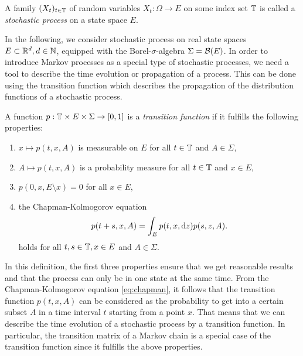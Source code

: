 \begin{defi}
A family $(X_t)_{t\in\mathbb{T}}$ of random variables $X_t : \Omega \rightarrow E$ on some index set $\mathbb{T}$ is called
a \textit{stochastic process} on a state space $E$.
\end{defi}

In the following, we consider stochastic process on real state spaces $E \subset \mathbb{R}^d, d \in \mathbb{N}$, equipped with the Borel-$\sigma$-algebra $\Sigma = \mathcal{B}(E)$. 
In order to introduce Markov processes as a special type of stochastic processes, we need a
tool to describe the time evolution or propagation of a process. This can be done using the transition function which describes the propagation of the distribution functions of a stochastic process.

\begin{defi}
A function $p: \mathbb{T} \times E \times \Sigma \rightarrow [0,1]$ is a \textit{transition function} if it fulfills the following properties:
\begin{enumerate}
\item $x \mapsto p(t,x,A)$ is measurable on $E$ for all $t\in\mathbb{T}$ and $A\in\Sigma$,
\item $A \mapsto p(t,x,A)$ is a probability measure for all $t\in\mathbb{T}$ and $x\in E$,
\item $p(0,x,E \setminus x) = 0$ for all $x \in E$,
\item the Chapman-Kolmogorov equation
\begin{equation}
\label{eq:chapman}
p(t+s,x,A) = \int_E p(t,x,\mathop{}\!\mathrm{d} z)p(s,z,A).
\end{equation}
holds for all $t,s\in\mathbb{T}, x\in E$ and $A\in\Sigma$.
\end{enumerate}
\end{defi}
In this definition, the first three properties ensure that we get reasonable results and that the process can only be in one state at the same time.
From the Chapman-Kolmogorov equation \eqref{eq:chapman}, it follows that the transition function $p(t,x,A)$ can be considered as the probability  to get into a certain subset $A$ in a time interval $t$ starting from a point $x$.
That means that we can describe the time evolution of a stochastic process by a transition function.
In particular, the transition matrix of a Markov chain is a special case of the transition function since it fulfills the above properties.

